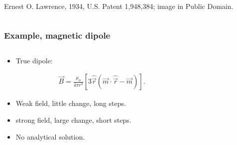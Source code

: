 \documentclass{beamer}
\begin{document}
\begin{frame}
\begin{columns}
\begin{column}{0.5\linewidth}
{{\color{gray} Ernest O. Lawrence, 1934, U.S. Patent 1,948,384; image in Public Domain.}
}%

\end{column}
\end{columns}
\end{frame}


\begin{frame}
\frametitle{Example, magnetic dipole}

\begin{columns}
\begin{column}{0.5\linewidth}
\begin{itemize}

\item <1-> True dipole:

\begin{align*}
\vec{B} = \frac{\mu_0}{4\pi r^3} \left[3 \hat{\vec{r}}(\vec{m}\cdot\hat{\vec{r}} -\vec{m}) \right].
\end{align*}

\item <2-> Weak field, little change, long steps.

\item <3-> strong field, large change, short steps.

\item <4-> No analytical solution.


\end{itemize}
\end{column}
\begin{column}{0.5\linewidth}



\end{column}
\end{columns}
\end{frame}
\end{document}
